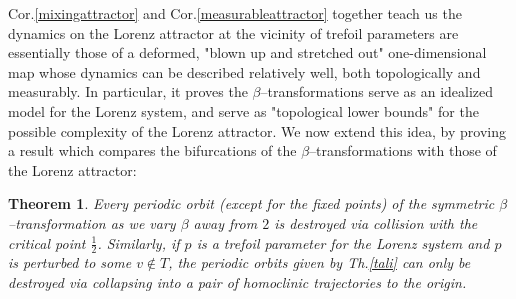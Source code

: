 \documentclass[10pt,reqno]{amsart}
\theoremstyle{plain}
\theoremstyle{assumption}
\theoremstyle{notation}
\theoremstyle{claim}
\theoremstyle{conj}
\theoremstyle{theorem}
\newtheorem{theorem}{Theorem}[section]
\theoremstyle{proposition}
\theoremstyle{corollary}
\begin{document}
Cor.\ref{mixingattractor} and Cor.\ref{measurableattractor} together  teach us the dynamics on the Lorenz attractor at the vicinity of trefoil parameters are essentially those of a deformed, "blown up and stretched out" one-dimensional map whose dynamics can be described relatively well, both topologically and measurably. In particular, it proves the $\beta$--transformations serve as an idealized model for the Lorenz system, and serve as "topological lower bounds" for the possible complexity of the Lorenz attractor. We now extend this idea, by proving a result which compares the bifurcations of the $\beta$--transformations with those of the Lorenz attractor: 
\begin{theorem}
\label{expl} Every periodic orbit (except for the fixed points) of the symmetric $\beta$--transformation as we vary $\beta$ away from $2$ is destroyed via collision with the critical point $\frac{1}{2}$. Similarly, if $p$ is a trefoil parameter for the Lorenz system and $p$ is perturbed to some $v\not\in T$, the periodic orbits given by Th.\ref{tali} can only be destroyed via collapsing into a pair of homoclinic trajectories to the origin.
\end{theorem}
\end{document}

